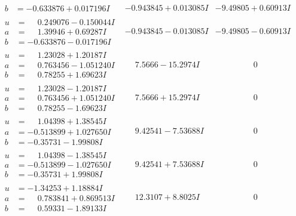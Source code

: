 \documentclass[1p]{elsarticle_modified}
\theoremstyle{definition}
\begin{document}
$$\begin{array}{c|c|c}
\begin{aligned}
b &= -0.633876 + 0.017196 I\end{aligned}
 & -0.943845 + 0.013085 I & -9.49805 + 0.60913 I \\ \hline\begin{aligned}
u &= \phantom{-}0.249076 - 0.150044 I \\
a &= \phantom{-}1.39946 + 0.69287 I \\
b &= -0.633876 - 0.017196 I\end{aligned}
 & -0.943845 - 0.013085 I & -9.49805 - 0.60913 I \\ \hline\begin{aligned}
u &= \phantom{-}1.23028 + 1.20187 I \\
a &= \phantom{-}0.763456 - 1.051240 I \\
b &= \phantom{-}0.78255 + 1.69623 I\end{aligned}
 & \phantom{-}7.5666 - 15.2974 I & \phantom{-0.000000 } 0 \\ \hline\begin{aligned}
u &= \phantom{-}1.23028 - 1.20187 I \\
a &= \phantom{-}0.763456 + 1.051240 I \\
b &= \phantom{-}0.78255 - 1.69623 I\end{aligned}
 & \phantom{-}7.5666 + 15.2974 I & \phantom{-0.000000 } 0 \\ \hline\begin{aligned}
u &= \phantom{-}1.04398 + 1.38545 I \\
a &= -0.513899 + 1.027650 I \\
b &= -0.35731 - 1.99808 I\end{aligned}
 & \phantom{-}9.42541 - 7.53688 I & \phantom{-0.000000 } 0 \\ \hline\begin{aligned}
u &= \phantom{-}1.04398 - 1.38545 I \\
a &= -0.513899 - 1.027650 I \\
b &= -0.35731 + 1.99808 I\end{aligned}
 & \phantom{-}9.42541 + 7.53688 I & \phantom{-0.000000 } 0 \\ \hline\begin{aligned}
u &= -1.34253 + 1.18884 I \\
a &= \phantom{-}0.783841 + 0.869513 I \\
b &= \phantom{-}0.59331 - 1.89133 I\end{aligned}
 & \phantom{-}12.3107 + 8.8025 I & \phantom{-0.000000 } 0 \\ \hline\begin{aligned}

\end{aligned}
\end{array}$$
\end{document}
